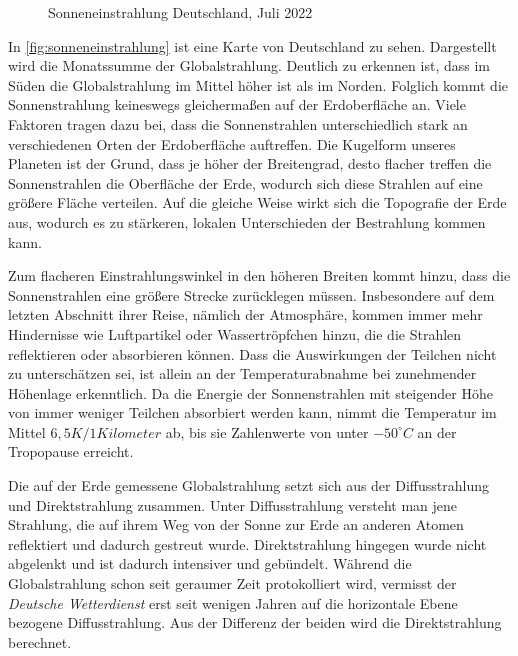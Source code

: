 \documentclass[12pt, a4paper]{article}
\begin{document}
\begin{figure}
\centering
\def\svgwidth{350pt}

\caption{Sonneneinstrahlung Deutschland, Juli 2022}
\label{fig:sonneneinstrahlung}
\end {figure}

In \autoref{fig:sonneneinstrahlung} ist eine Karte von Deutschland zu sehen. Dargestellt wird die Monatssumme der Globalstrahlung. Deutlich zu erkennen ist, dass im Süden die Globalstrahlung im Mittel höher ist als im Norden. Folglich kommt die Sonnenstrahlung keineswegs gleichermaßen auf der Erdoberfläche an. Viele Faktoren tragen dazu bei, dass die Sonnenstrahlen unterschiedlich stark an verschiedenen Orten der Erdoberfläche auftreffen. Die Kugelform unseres Planeten ist der Grund, dass je höher der Breitengrad, desto flacher treffen die Sonnenstrahlen die Oberfläche der Erde, wodurch sich diese Strahlen auf eine größere Fläche verteilen. Auf die gleiche Weise wirkt sich die Topografie der Erde aus, wodurch es zu stärkeren, lokalen Unterschieden der Bestrahlung kommen kann.

Zum flacheren Einstrahlungswinkel in den höheren Breiten kommt hinzu, dass die Sonnenstrahlen eine größere Strecke zurücklegen müssen. Insbesondere auf dem letzten Abschnitt ihrer Reise, nämlich der Atmosphäre, kommen immer mehr Hindernisse wie Luftpartikel oder Wassertröpfchen hinzu, die die Strahlen reflektieren oder absorbieren können. Dass die Auswirkungen der Teilchen nicht zu unterschätzen sei, ist allein an der Temperaturabnahme bei zunehmender Höhenlage erkenntlich. Da die Energie der Sonnenstrahlen mit steigender Höhe von immer weniger Teilchen absorbiert werden kann, nimmt die Temperatur im Mittel $6,5 K/ 1 Kilometer$  ab, bis sie Zahlenwerte von unter $-50 ^\circ C$ an der Tropopause erreicht.


Die auf der Erde gemessene Globalstrahlung setzt sich aus der Diffusstrahlung und Direktstrahlung zusammen. Unter Diffusstrahlung versteht man jene Strahlung, die auf ihrem Weg von der Sonne zur Erde an anderen Atomen reflektiert und dadurch gestreut wurde. Direktstrahlung hingegen wurde nicht abgelenkt und ist dadurch intensiver und gebündelt. Während die Globalstrahlung schon seit geraumer Zeit protokolliert wird,  vermisst der \textit{Deutsche Wetterdienst} erst seit wenigen Jahren auf die horizontale Ebene bezogene Diffusstrahlung. Aus der Differenz der beiden wird die Direktstrahlung berechnet. 
\end{document}
